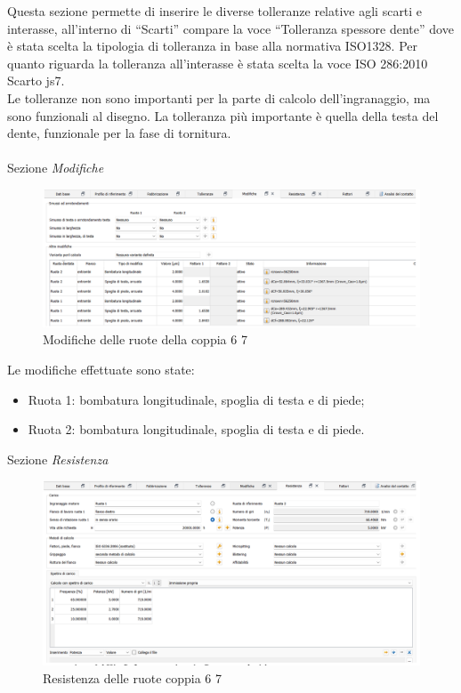 Questa sezione permette di inserire le diverse tolleranze relative agli scarti e interasse, all’interno di “Scarti” compare la voce “Tolleranza spessore dente” dove è stata scelta la tipologia di tolleranza in base alla normativa ISO1328. Per quanto riguarda la tolleranza all’interasse è stata scelta la voce ISO 286:2010 Scarto js7.\\
Le tolleranze non sono importanti per la parte di calcolo dell’ingranaggio, ma sono funzionali al disegno. La tolleranza più importante è quella della testa del dente, funzionale per la fase di tornitura. \\
\\
Sezione \emph{Modifiche}
\begin{figure}[h]
    \centering
    \includegraphics[scale=0.5]{Immagini/ModificheCoppia67.png}
    \caption{Modifiche delle ruote della coppia 6 7}
    \label{fig:ModificheCoppia67}
\end{figure}

Le modifiche effettuate sono state:
\begin{itemize}
    \item Ruota 1: bombatura longitudinale, spoglia di testa e di piede;
    \item Ruota 2: bombatura longitudinale, spoglia di testa e di piede.
\end{itemize}
\newpage
Sezione \emph{Resistenza}
\begin{figure}[h]
    \centering
    \includegraphics[scale=0.5]{Immagini/ResistenzaCoppia67.png}
    \caption{Resistenza delle ruote coppia 6 7}
    \label{fig:ResistenzaCoppia67}
\end{figure}

